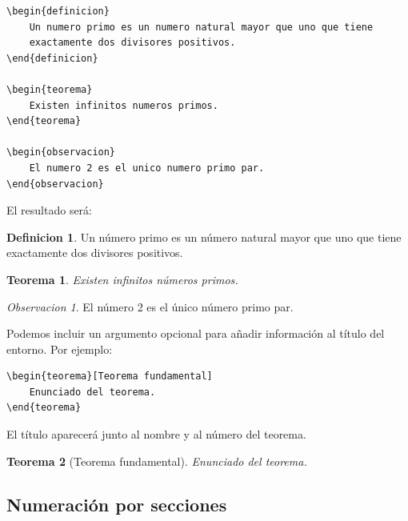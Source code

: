 \documentclass[11pt,a4paper]{article}
\theoremstyle{plain}
\newtheorem{teorema}{Teorema}
\theoremstyle{definition}
\newtheorem{definicion}{Definicion}
\theoremstyle{remark}
\newtheorem{observacion}{Observacion}
\theoremstyle{exercise}
\begin{document}
\begin{lstlisting}
\begin{definicion}
    Un numero primo es un numero natural mayor que uno que tiene 
    exactamente dos divisores positivos.
\end{definicion}

\begin{teorema}
    Existen infinitos numeros primos.
\end{teorema}

\begin{observacion}
    El numero 2 es el unico numero primo par.
\end{observacion}
\end{lstlisting}

\noindent El resultado será:

\begin{paginarecuadrada}
\begin{definicion}
    Un número primo es un número natural mayor que uno que tiene exactamente dos divisores
    positivos.
\end{definicion}

\begin{teorema}
    Existen infinitos números primos.
\end{teorema}

\begin{observacion}
    El número 2 es el único número primo par.
\end{observacion}
\end{paginarecuadrada}

\medskip

\noindent Podemos incluir un argumento opcional para
añadir información al título del entorno. Por ejemplo:

\begin{lstlisting}
\begin{teorema}[Teorema fundamental]
    Enunciado del teorema.
\end{teorema}
\end{lstlisting}

\noindent El título aparecerá junto al nombre y al
número del teorema.

\begin{paginarecuadrada}
\begin{teorema}[Teorema fundamental]
    Enunciado del teorema.
\end{teorema}
\end{paginarecuadrada}


\subsection{Numeración por secciones}
\end{document}

